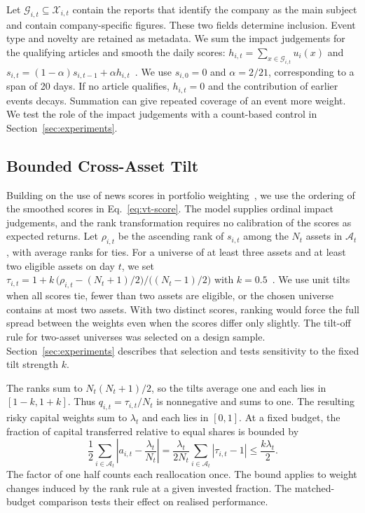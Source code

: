 Let $\mathcal{G}_{i,t}\subseteq\mathcal{X}_{i,t}$ contain the reports that identify the company as the main subject and contain company-specific figures. These two fields determine inclusion. Event type and novelty are retained as metadata. We sum the impact judgements for the qualifying articles and smooth the daily scores:
$h_{i,t}=\sum_{x\in\mathcal{G}_{i,t}}u_i(x)$ and $s_{i,t}=(1-\alpha)s_{i,t-1}+\alpha h_{i,t}$~.
We use $s_{i,0}=0$ and $\alpha=2/21$, corresponding to a span of 20 days. If no article qualifies, $h_{i,t}=0$ and the contribution of earlier events decays. Summation can give repeated coverage of an event more weight. We test the role of the impact judgements with a count-based control in Section~\ref{sec:experiments}.

\subsection{Bounded Cross-Asset Tilt}

Building on the use of news scores in portfolio weighting~\cite{anic2025systematic}, we use the ordering of the smoothed scores in Eq.~\eqref{eq:vt-score}. The model supplies ordinal impact judgements, and the rank transformation requires no calibration of the scores as expected returns. Let $\rho_{i,t}$ be the ascending rank of $s_{i,t}$ among the $N_t$ assets in $\mathcal{A}_t$, with average ranks for ties. For a universe of at least three assets and at least two eligible assets on day $t$, we set
$\tau_{i,t}=1+k\,\bigl(\rho_{i,t}-(N_t+1)/2\bigr)/\bigl((N_t-1)/2\bigr)$ with $k=0.5$~.
We use unit tilts when all scores tie, fewer than two assets are eligible, or the chosen universe contains at most two assets. With two distinct scores, ranking would force the full spread between the weights even when the scores differ only slightly. The tilt-off rule for two-asset universes was selected on a design sample. Section~\ref{sec:experiments} describes that selection and tests sensitivity to the fixed tilt strength $k$.

The ranks sum to $N_t(N_t+1)/2$, so the tilts average one and each lies in $[1-k,1+k]$. Thus $q_{i,t}=\tau_{i,t}/N_t$ is nonnegative and sums to one. The resulting risky capital weights sum to $\lambda_t$ and each lies in $[0,1]$. At a fixed budget, the fraction of capital transferred relative to equal shares is bounded by
\begin{equation}
  \frac{1}{2}\sum_{i\in\mathcal{A}_t}\left|a_{i,t}-\frac{\lambda_t}{N_t}\right|
  =\frac{\lambda_t}{2N_t}\sum_{i\in\mathcal{A}_t}|\tau_{i,t}-1|
  \leq\frac{k\lambda_t}{2}.
  \label{eq:vt-transfer}
\end{equation}
The factor of one half counts each reallocation once. The bound applies to weight changes induced by the rank rule at a given invested fraction. The matched-budget comparison tests their effect on realised performance.

